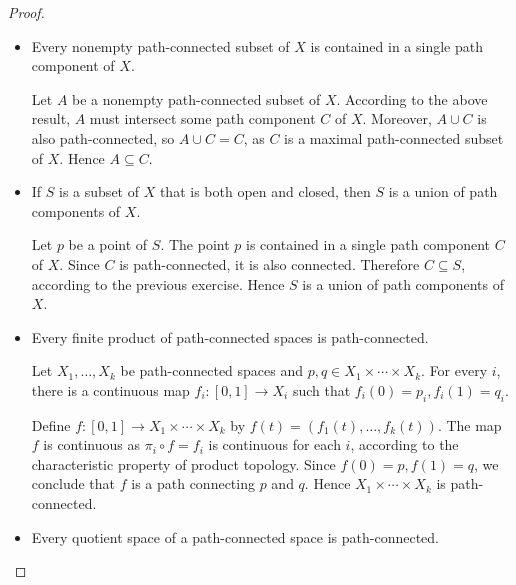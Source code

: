 \begin{proof}
\begin{enumerate}[itemsep=0pt,label={(\alph*)}]
\begin{itemize}
                        Secondly, we prove that each point is contained in a single path component.

                        Let \( x_{0} \) be a point of \( X \) and \( C \) the union of every path-connected subset containing \( x_{0} \). According to the second result in this list, \( C \) is path-connected. Moreover, \( C \) is a maximal path-connected.

                        Therefore the path components of \( X \) form a partition of \( X \).
                  \item Every nonempty path-connected subset of \( X \) is contained in a single path component of \( X \).

                        Let \( A \) be a nonempty path-connected subset of \( X \). According to the above result, \( A \) must intersect some path component \( C \) of \( X \). Moreover, \( A \cup C \) is also path-connected, so \( A \cup C = C \), as \( C \) is a maximal path-connected subset of \( X \). Hence \( A \subseteq C \).
                  \item If \( S \) is a subset of \( X \) that is both open and closed, then \( S \) is a union of path components of \( X \).

                        Let \( p \) be a point of \( S \). The point \( p \) is contained in a single path component \( C \) of \( X \). Since \( C \) is path-connected, it is also connected. Therefore \( C \subseteq S \), according to the previous exercise. Hence \( S \) is a union of path components of \( X \).
                  \item Every finite product of path-connected spaces is path-connected.

                        Let \( X_{1}, \ldots, X_{k} \) be path-connected spaces and \( p, q \in X_{1} \times \cdots \times X_{k} \). For every \( i \), there is a continuous map \( f_{i}: [0, 1] \to X_{i} \) such that \( f_{i}(0) = p_{i}, f_{i}(1) = q_{i} \).

                        Define \( f: [0, 1] \to X_{1} \times \cdots \times X_{k} \) by \( f(t) = (f_{1}(t), \ldots, f_{k}(t)) \). The map \( f \) is continuous as \( \pi_{i} \circ f = f_{i} \) is continuous for each \( i \), according to the characteristic property of product topology. Since \( f(0) = p, f(1) = q \), we conclude that \( f \) is a path connecting \( p \) and \( q \). Hence \( X_{1} \times \cdots \times X_{k} \) is path-connected.
                  \item Every quotient space of a path-connected space is path-connected.


\end{itemize}
\end{enumerate}
\end{proof}
